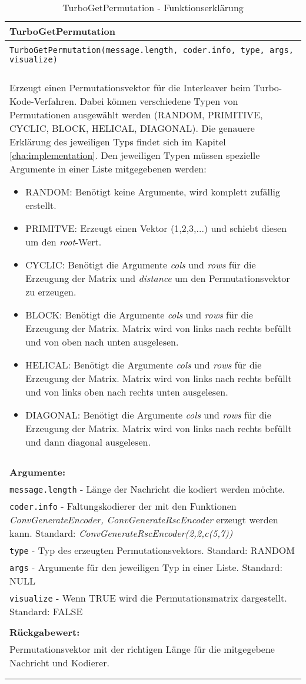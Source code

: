 \begin{longtable}{|p{\textwidth}|}
\hline
\rowcolor{lightblue}TurboGetPermutation\\
\hline
\\
\texttt{TurboGetPermutation(message.length, coder.info, type, args, visualize)}\\
\\
Erzeugt einen Permutationsvektor für die Interleaver beim Turbo-Kode-Verfahren. Dabei können verschiedene Typen von Permutationen ausgewählt werden (RANDOM, PRIMITIVE, CYCLIC, BLOCK, HELICAL, DIAGONAL). Die genauere Erklärung des jeweiligen Typs findet sich im Kapitel \ref{cha:implementation}. Den jeweiligen Typen müssen spezielle Argumente in einer Liste mitgegebenen werden:
\begin{itemize}
\item RANDOM: Benötigt keine Argumente, wird komplett zufällig erstellt.
\item PRIMITVE: Erzeugt einen Vektor (1,2,3,...) und schiebt diesen um den \emph{root}-Wert.
\item CYCLIC: Benötigt die Argumente \emph{cols} und \emph{rows} für die Erzeugung der Matrix und \emph{distance} um den Permutationsvektor zu erzeugen.
\item BLOCK: Benötigt die Argumente \emph{cols} und \emph{rows} für die Erzeugung der Matrix. Matrix wird von links nach rechts befüllt und von oben nach unten ausgelesen.
\item HELICAL: Benötigt die Argumente \emph{cols} und \emph{rows} für die Erzeugung der Matrix. Matrix wird von links nach rechts befüllt und von links oben nach rechts unten ausgelesen.
\item DIAGONAL: Benötigt die Argumente \emph{cols} und \emph{rows} für die Erzeugung der Matrix. Matrix wird von links nach rechts befüllt und dann diagonal ausgelesen.
\end{itemize} \\
\\
\textbf{Argumente:}\\
\texttt{message.length} - Länge der Nachricht die kodiert werden möchte.\\
\texttt{coder.info} - Faltungskodierer der mit den Funktionen \emph{ConvGenerateEncoder, ConvGenerateRscEncoder} erzeugt werden kann. Standard: \emph{ConvGenerateRscEncoder(2,2,c(5,7))}\\
\texttt{type} - Typ des erzeugten Permutationsvektors. Standard: RANDOM\\
\texttt{args} - Argumente für den jeweiligen Typ in einer Liste. Standard: NULL\\
\texttt{visualize} - Wenn TRUE wird die Permutationsmatrix dargestellt. Standard: FALSE\\
\\
\textbf{Rückgabewert:}\\
Permutationsvektor mit der richtigen Länge für die mitgegebene Nachricht und Kodierer.\\
\\
\hline
\caption[TurboGetPermutation]{TurboGetPermutation - Funktionserklärung}
\end{longtable}